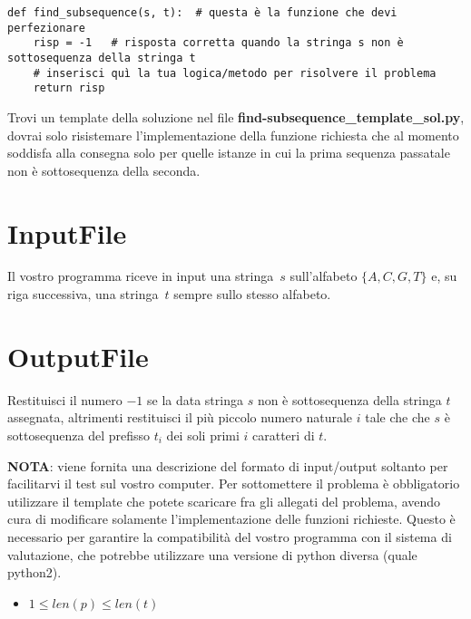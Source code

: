 \begin{verbatim}
def find_subsequence(s, t):  # questa è la funzione che devi perfezionare
    risp = -1   # risposta corretta quando la stringa s non è sottosequenza della stringa t
    # inserisci quì la tua logica/metodo per risolvere il problema
    return risp
\end{verbatim}

Trovi un template della soluzione nel file \textbf{find-subsequence\_template\_sol.py}, 
dovrai solo risistemare l'implementazione della funzione richiesta che al momento soddisfa 
alla consegna solo per quelle istanze in cui la prima sequenza passatale non è sottosequenza della seconda.

\section{InputFile}
Il vostro programma riceve in input una stringa~$s$ sull'alfabeto $\{A,C,G,T\}$ e, 
su riga successiva, una stringa~$t$ sempre sullo stesso alfabeto. 

\section{OutputFile}
Restituisci il numero $-1$ se la data stringa $s$ non è sottosequenza della stringa 
$t$ assegnata, altrimenti restituisci il più piccolo numero naturale $i$ tale che 
che $s$ è sottosequenza del prefisso $t_i$ dei soli primi $i$ caratteri di $t$.

\textbf{NOTA}: viene fornita una descrizione del formato di input/output soltanto 
per facilitarvi il test sul vostro computer. Per sottomettere il problema è obbligatorio 
utilizzare il template che potete scaricare fra gli allegati del problema, avendo 
cura di modificare solamente l'implementazione delle funzioni richieste. Questo 
è necessario per garantire la compatibilità del vostro programma con il sistema 
di valutazione, che potrebbe utilizzare una versione di python diversa (quale python2).

\esempio{

}{}

\esempio{

}{}

\esempio{

}{}



\begin{itemize}[nolistsep, noitemsep]
  \item $1\leq len(p) \leq len(t)$
\end{itemize}


